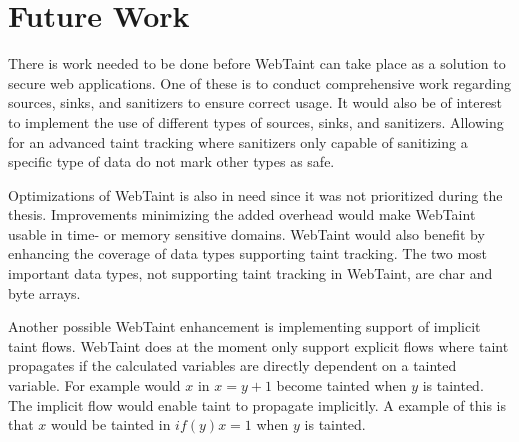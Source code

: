 \chapter{Future Work}
\label{FutureWork}
There is work needed to be done before WebTaint can take place as a solution to secure web applications. One of these is to conduct comprehensive work regarding sources, sinks, and sanitizers to ensure correct usage. It would also be of interest to implement the use of different types of sources, sinks, and sanitizers. Allowing for an advanced taint tracking where sanitizers only capable of sanitizing a specific type of data do not mark other types as safe. 

Optimizations of WebTaint is also in need since it was not prioritized during the thesis. Improvements minimizing the added overhead would make WebTaint usable in time- or memory sensitive domains. WebTaint would also benefit by enhancing the coverage of data types supporting taint tracking. The two most important data types, not supporting taint tracking in WebTaint, are char and byte arrays. 

Another possible WebTaint enhancement is implementing support of implicit taint flows. WebTaint does at the moment only support explicit flows where taint propagates if the calculated variables are directly dependent on a tainted variable. For example would $ x $ in $ x = y + 1 $ become tainted when $ y $ is tainted. The implicit flow would enable taint to propagate implicitly. A example of this is that $ x $ would be tainted in $ if (y) x = 1 $ when $ y $ is tainted.